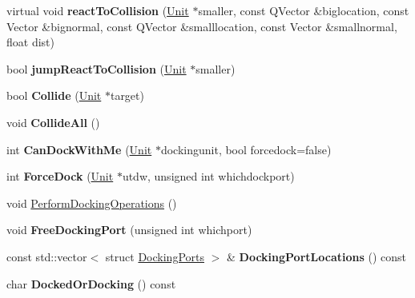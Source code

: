 \begin{DoxyCompactItemize}
\item 
virtual void {\bfseries react\+To\+Collision} (\hyperlink{classUnit}{Unit} $\ast$smaller, const Q\+Vector \&biglocation, const Vector \&bignormal, const Q\+Vector \&smalllocation, const Vector \&smallnormal, float dist)\hypertarget{classUnit_aaab2bcb98efc394d990d88cd096ed387}{}\label{classUnit_aaab2bcb98efc394d990d88cd096ed387}

\item 
bool {\bfseries jump\+React\+To\+Collision} (\hyperlink{classUnit}{Unit} $\ast$smaller)\hypertarget{classUnit_ad81cbd5c9fde47f04c9ae6c46fa1293f}{}\label{classUnit_ad81cbd5c9fde47f04c9ae6c46fa1293f}

\item 
bool {\bfseries Collide} (\hyperlink{classUnit}{Unit} $\ast$target)\hypertarget{classUnit_a995b1fe6016dfeaf7735b5e965b372ad}{}\label{classUnit_a995b1fe6016dfeaf7735b5e965b372ad}

\item 
void {\bfseries Collide\+All} ()\hypertarget{classUnit_a7175055062ae1c05e0471ba427801cc8}{}\label{classUnit_a7175055062ae1c05e0471ba427801cc8}

\item 
int {\bfseries Can\+Dock\+With\+Me} (\hyperlink{classUnit}{Unit} $\ast$dockingunit, bool forcedock=false)\hypertarget{classUnit_a74617863fcc20cee3aac7ebcb28c6cbd}{}\label{classUnit_a74617863fcc20cee3aac7ebcb28c6cbd}

\item 
int {\bfseries Force\+Dock} (\hyperlink{classUnit}{Unit} $\ast$utdw, unsigned int whichdockport)\hypertarget{classUnit_a5517327ce33dc44ee8fcc9100f26dc3d}{}\label{classUnit_a5517327ce33dc44ee8fcc9100f26dc3d}

\item 
void \hyperlink{classUnit_ae8ce3e78a9b112377c7051f8cf731342}{Perform\+Docking\+Operations} ()
\item 
void {\bfseries Free\+Docking\+Port} (unsigned int whichport)\hypertarget{classUnit_af42e99a5e8fb6198c94fa87f66671819}{}\label{classUnit_af42e99a5e8fb6198c94fa87f66671819}

\item 
const std\+::vector$<$ struct \hyperlink{structDockingPorts}{Docking\+Ports} $>$ \& {\bfseries Docking\+Port\+Locations} () const \hypertarget{classUnit_a5b9ebe6ffbe7e165e8c8f5b086505ebd}{}\label{classUnit_a5b9ebe6ffbe7e165e8c8f5b086505ebd}

\item 
char {\bfseries Docked\+Or\+Docking} () const \hypertarget{classUnit_a55ec729326cdb93a0af9cafd1a154148}{}\label{classUnit_a55ec729326cdb93a0af9cafd1a154148}


\end{DoxyCompactItemize}
